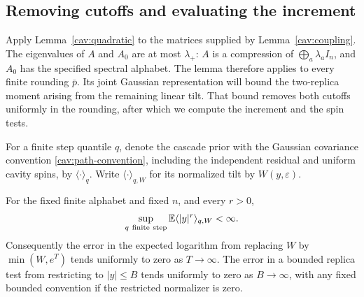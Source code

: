 \subsection{Removing cutoffs and evaluating the increment}

Apply Lemma~\ref{cav:quadratic} to the matrices supplied by
Lemma~\ref{cav:coupling}.  The eigenvalues of $A$ and $A_0$ are at most
$\lambda_+$: $A$ is a compression of
$\bigoplus_a\lambda_a I_n$, and $A_0$ has the specified spectral
alphabet.  The lemma therefore applies to every finite rounding
$\bar p$.  Its joint Gaussian representation will bound the two-replica
moment arising from the remaining linear tilt.  That bound removes both
cutoffs uniformly in the rounding, after which we compute the increment
and the spin tests.

For a finite step quantile $q$, denote the cascade prior with the
Gaussian covariance convention \eqref{cav:path-convention}, including
the independent residual and uniform cavity spins, by
$\langle\cdot\rangle_q$.  Write
$\langle\cdot\rangle_{q,W}$ for its normalized tilt by
$W(y,\varepsilon)$.

\begin{lemma}\label{cav:cutoffs}
For the fixed finite alphabet and fixed $n$, and every $r>0$,
\begin{equation}\label{cav:tilted-moments}
 \sup_{q\ \mathrm{finite\ step}}
 \mathbb E\langle |y|^r\rangle_{q,W}<\infty.
\end{equation}
Consequently the error in the expected logarithm from replacing $W$
by $\min(W,e^T)$ tends uniformly to zero as $T\to\infty$.  The error
in a bounded replica test from restricting to $|y|\le B$ tends
uniformly to zero as $B\to\infty$, with any fixed bounded convention
if the restricted normalizer is zero.
\end{lemma}


